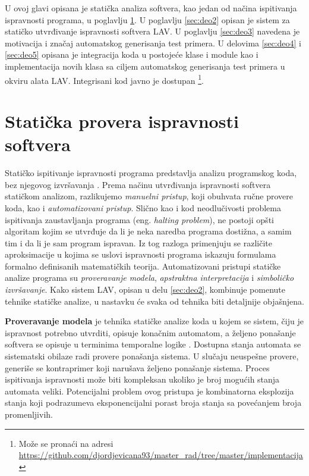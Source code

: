 \documentclass[12pt,oneside]{memoir}
\begin{document}
U ovoj glavi opisana je statička analiza softvera, kao jedan od načina ispitivanja ispravnosti programa, u poglavlju \ref{sec:deo1}. U poglavlju \ref{sec:deo2} opisan je sistem za statičko utvrđivanje ispravnosti softvera LAV. U poglavlju \ref{sec:deo3} navedena je motivacija i značaj automatskog generisanja test primera. U delovima \ref{sec:deo4} i \ref{sec:deo5} opisana je integracija koda u postojeće klase i module kao i implementacija novih klasa sa ciljem automatskog generisanja test primera u okviru alata LAV. Integrisani kod javno je dostupan \footnote{Može se pronaći na adresi \url{https://github.com/djordjevicana93/master_rad/tree/master/implementacija}}.


\section{Statička provera ispravnosti softvera} \label{sec:deo1}
Statičko ispitivanje ispravnosti programa predstavlja analizu programskog koda, bez njegovog izvršavanja \cite{StaticVerification}. Prema načinu utvrđivanja ispravnosti softvera statičkom analizom, razlikujemo \emph{manuelni pristup}, koji obuhvata ručne provere koda, kao i \emph{automatizovani pristup}. Slično kao i kod neodlučivosti problema ispitivanja zaustavljanja programa (eng. \textit{halting problem}), ne postoji opšti algoritam kojim se utvrđuje da li je neka naredba programa dostižna, a samim tim i da li je sam program ispravan. Iz tog razloga primenjuju se različite aproksimacije u kojima se uslovi ispravnosti programa iskazuju formulama formalno definisanih matematičkih teorija. Automatizovani pristupi statičke analize programa su \emph{proveravanje modela}, \textit{apstraktna interpretacija} i \textit{simboličko izvršavanje}. Kako sistem LAV, opisan u delu \ref{sec:deo2}, kombinuje pomenute tehnike statičke analize, u nastavku će svaka od tehnika biti detaljnije objašnjena.
\par
\textbf{Proveravanje modela} je tehnika statičke analize koda u kojem se sistem, čiju je ispravnost potrebno utvrditi, opisuje konačnim automatom, a željeno ponašanje softvera se opisuje u terminima temporalne logike \cite{TemporalLogic}. Dostupna stanja automata se sistematski obilaze radi provere ponašanja sistema. U slučaju neuspešne provere, generiše se kontraprimer koji narušava željeno ponašanje sistema. Proces ispitivanja ispravnosti može biti kompleksan ukoliko je broj mogućih stanja automata veliki. Potencijalni problem ovog pristupa je kombinatorna eksplozija stanja koji podrazumeva eksponencijalni porast broja stanja sa povećanjem broja promenljivih.
\end{document}
